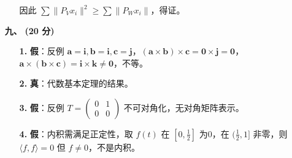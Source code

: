 \documentclass{ctexart}
\begin{document}
\begin{enumerate}
\begin{enumerate}
        因此 $\sum\|P_V x_i\|^2 \ge \sum\|P_W x_i\|$，得证。
    \end{enumerate}
    \item[\textbf{九、}] \textbf{(20 分)} \begin{enumerate}
        \item[\textbf{1.}] \textbf{假}：反例 \(\boldsymbol{a}=\boldsymbol{i},\boldsymbol{b}=\boldsymbol{i},\boldsymbol{c}=\boldsymbol{j}\)，\((\boldsymbol{a}\times\boldsymbol{b})\times\boldsymbol{c}=\boldsymbol{0}\times\boldsymbol{j}=\boldsymbol{0}\)，\(\boldsymbol{a}\times(\boldsymbol{b}\times\boldsymbol{c})=\boldsymbol{i}\times\boldsymbol{k}\neq\boldsymbol{0}\)，不等。
        \item[\textbf{2.}] \textbf{真}：代数基本定理的结果。
        \item[\textbf{3.}] \textbf{假}：反例 \(T=\begin{pmatrix}0&1\\0&0\end{pmatrix}\) 不可对角化，无对角矩阵表示。
        \item[\textbf{4.}] \textbf{假}：内积需满足正定性，取 \(f(t)\) 在 \([0,\frac{1}{2}]\) 为0，在 \((\frac{1}{2},1]\) 非零，则 \(\langle f,f\rangle=0\) 但 \(f\neq0\)，不是内积。  
    \end{enumerate}
\end{enumerate}
\end{document}
